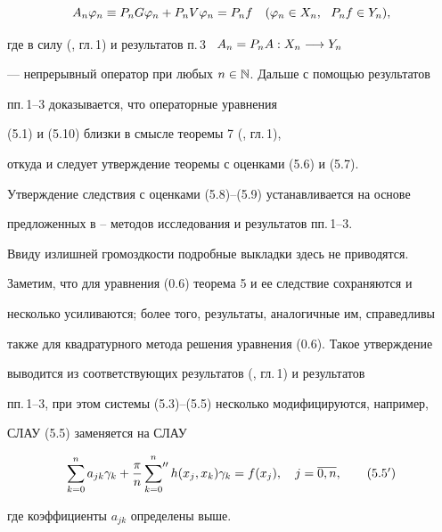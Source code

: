 \begin{equation}


A_n\vp_n\equiv P_nG\vp_n+P_nV\vp_n=P_nf\quad (\vp_n\in X_n,\ \ P_nf\in Y_n),


\end{equation}


где в силу (\cite{4}, гл.\,1) и результатов п.\,3 \ $A_n=P_nA : X_n \longrightarrow Y_n$


--- непрерывный оператор при любых $n\in \Bbb{N}$. Дальше с помощью результатов


пп.\,1--3 доказывается, что операторные уравнения


(5.1) и (5.10) близки в смысле теоремы 7 (\cite{3}, гл.\,1),


откуда и следует утверждение теоремы с оценками (5.6) и (5.7).





Утверждение следствия с оценками (5.8)--(5.9) устанавливается на основе


предложенных в \cite{2}--\cite{5} методов исследования и результатов пп.\,1--3. 


Ввиду излишней громоздкости подробные выкладки здесь не приводятся.





Заметим, что для уравнения (0.6) теорема 5 и ее следствие сохраняются и 


несколько усиливаются; более того, результаты, аналогичные им, справедливы 


также для квадратурного метода решения уравнения (0.6). Такое утверждение 


выводится из соответствующих результатов (\cite{4}, гл.\,1) и результатов


пп.\,1--3, при этом системы (5.3)--(5.5) несколько модифицируются, например,


СЛАУ (5.5) заменяется на СЛАУ


\begin{equation}


\sum_{k=0}^n a_{jk}\gamma_k+\frac{\pi}{n}


\sideset{}{''}\sum_{k=0}^n h(x_j,x_k)\gamma_k=f(x_j),\quad j=\overline{0,n},


\tag{5.5${}'$}


\end{equation}


где коэффициенты $a_{jk}$ определены выше.








